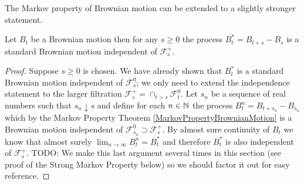 The Markov property of Brownian motion can be extended to a slightly
stronger statement.
\begin{thm}\label{ExtendedMarkovPropertyBrownianMotion}Let $B_t$ be a
  Brownian motion then for any $s \geq 0$ the process $B^*_t = B_{t + s} -
  B_s$ is a standard Brownian motion independent of $\mathcal{F}^+_s$.
\end{thm}
\begin{proof}
Suppose $s \geq 0$ is chosen.  We have already shown that $B^*_t$ is a standard Brownian motion
independent of $\mathcal{F}^0_s$; we only need to extend the independence
statement to the larger filtration $\mathcal{F}^+_s = \cap_{t > s}
\mathcal{F}^0_t$.  Let $s_n$ be a sequence of real numbers such that
$s_n \downarrow s$ and define for each $n \in \mathbb{N}$ the process $B^n_t
= B_{t+s_n} - B_{s_n}$ which by the Markov Property Theorem
\ref{MarkovPropertyBrownianMotion} is a Brownian motion independent of
$\mathcal{F}^0_{s_n} \supset \mathcal{F}^+_{s} $.  By almost sure continuity of $B_t$ we know
that almost surely $\lim_{n \to \infty} B^n_t = B^*_t$ and therefore
$B^*_t$ is also independent of $\mathcal{F}^+_{s}$.  TODO: We make
this last argument several times in this section (see proof of the
Strong Markov Property below) so we should factor it out for easy reference.
\end{proof}

